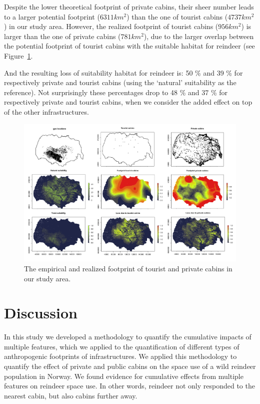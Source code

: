 \documentclass{article}
\begin{document}
Despite the lower theoretical footprint of private cabins, their sheer number leads to a larger potential footprint ($6311 km^2$) than the one of tourist cabins ($4737 km^2$) in our study area. However, the realized footprint of tourist cabins ($956 km^2$) is larger than the one of private cabins ($781 km^2$), due to the larger overlap between the potential footprint of tourist cabins with the suitable habitat for reindeer (see Figure~\ref{fig:empirical_footprint}. 

And the resulting loss of suitability habitat for reindeer is: 50 \%  and 39 \% for respectively private and tourist cabins (using the `natural' suitability as the reference). Not surprisingly these percentages drop to 48 \% and 37 \% for respectively private and tourist cabins, when we consider the added effect on top of the other infrastructures.

\begin{figure}
    \centering
    \includegraphics[width=1.0\textwidth]{figures/empirical_footprint.png}
    \caption{\label{fig:empirical_footprint} The empirical and realized footprint of tourist and private cabins in our study area. }
\end{figure}


\section{Discussion}

In this study we developed a methodology to quantify the cumulative impacts of multiple features, which we applied to the quantification of different types of anthropogenic footprints of infrastructures. We applied this methodology to quantify the effect of private and public cabins on the space use of a wild reindeer population in Norway. We found evidence for cumulative effects from multiple features on reindeer space use. In other words, reindeer not only responded to the nearest cabin, but also cabins further away. 
\end{document}
